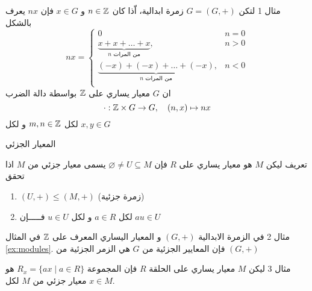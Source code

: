\begin{frame}
	
	\pause
		\begin{exampleblock}{مثال 1}
		لتكن $G=(G, +)$ زمرة ابدالية، اّذا كان $n\in\mathbb{Z}$ و $x\in G$ فإن $nx$ يعرف بالشكل 
		\[
		nx = 
		\begin{cases}
			0 & n=0 \\
			\underbrace{x+x+\dots+x}_{\text{$n$ من المرات}}, & n>0\\
			\underbrace{(-x)+(-x)+\dots+(-x)}_{\text{$n$ من المرات}}, & n<0\\
		\end{cases}
		\]
		 ان $G$ معيار يساري على $\mathbb{Z}$ بواسطة دالة الضرب
		\[
		\cdot : \mathbb{Z}\times G \to G, \quad (n,x) \mapsto nx
		\]
		لكل $m,n\in \mathbb{Z}$ و لكل $x,y\in G$
	\end{exampleblock}
\end{frame}

\begin{frame}{المعيار الجزئي}
	
	\pause
	\begin{exampleblock}{تعريف}
		ليكن $M$ هو معيار يساري على $R$ فإن $\varnothing\neq U\subseteq M$ يسمى معيار جزئي من $M$ اذا تحقق
		\begin{enumerate}
			\item $(U, +) \leq (M, +)$ (زمرة جزئية)
			\item  لكل $a\in R$ و لكل $u\in U$ فـــــإن $au\in U$
		\end{enumerate}
	\end{exampleblock}
	
	\pause
	\begin{exampleblock}{مثال 2}
		في الزمرة الابدالية $(G,+)$ و المعيار اليساري المعرف على $\mathbb{Z}$ في المثال \ref{ex:modules}. فإن المعايير الجزئية من $G$ هي الزمر الجزئية من $(G,+)$
	\end{exampleblock}
	
	\pause
		\begin{exampleblock}{مثال 3}
		ليكن $M$ معيار يساري على الحلقة $R$ فإن المجموعة $R_x=\{ax\mid a\in R\}$ هو معيار جزئي من $M$ لكل $x\in M$.
	\end{exampleblock}
\end{frame}


